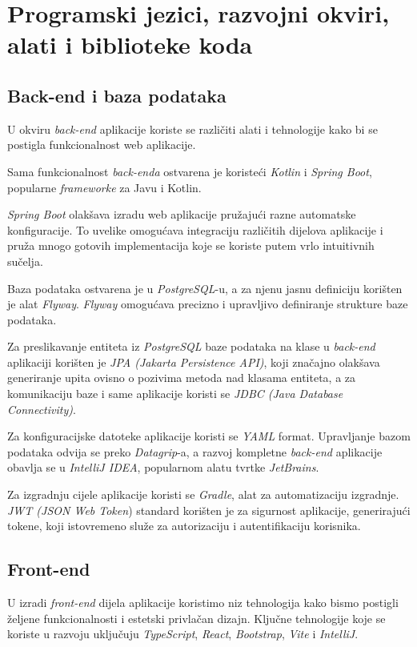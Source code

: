 		
		\section{Programski jezici, razvojni okviri, alati i biblioteke koda}
		
		
		\subsection{Back-end i baza podataka}
		U okviru \textit{back-end} aplikacije koriste se različiti alati i tehnologije kako bi se postigla funkcionalnost web aplikacije. 
		
		Sama funkcionalnost \textit{back-enda} ostvarena je koristeći \textit{Kotlin} i \textit{Spring Boot}, popularne \textit{frameworke} za Javu i Kotlin.
		
		\textit{Spring Boot} olakšava izradu web aplikacije pružajući razne automatske konfiguracije. To uvelike omogućava integraciju različitih dijelova aplikacije i pruža mnogo gotovih implementacija koje se koriste putem vrlo intuitivnih sučelja.
		
		Baza podataka ostvarena je u \textit{PostgreSQL}-u, a za njenu jasnu definiciju korišten je alat \textit{Flyway}. \textit{Flyway} omogućava precizno i upravljivo definiranje strukture baze podataka.
		
		Za preslikavanje entiteta iz \textit{PostgreSQL} baze podataka na klase u \textit{back-end} aplikaciji korišten je \textit{JPA (Jakarta Persistence API)}, koji značajno olakšava generiranje upita ovisno o pozivima metoda nad klasama entiteta, a za komunikaciju baze i same aplikacije koristi se \textit{JDBC (Java Database Connectivity)}.
		
		Za konfiguracijske datoteke aplikacije koristi se \textit{YAML} format. Upravljanje bazom podataka odvija se preko \textit{Datagrip}-a, a razvoj kompletne \textit{back-end} aplikacije obavlja se u \textit{IntelliJ IDEA}, popularnom alatu tvrtke \textit{JetBrains}. 
		
		Za izgradnju cijele aplikacije koristi se \textit{Gradle}, alat za automatizaciju izgradnje. 
\textit{JWT (JSON Web Token}) standard korišten je za sigurnost aplikacije, generirajući tokene, koji istovremeno služe za autorizaciju i autentifikaciju korisnika.


			\subsection{Front-end}
			U izradi \textit{front-end} dijela aplikacije koristimo niz tehnologija kako bismo postigli željene funkcionalnosti i estetski privlačan dizajn. Ključne tehnologije koje se koriste u razvoju uključuju \textit{TypeScript}, \textit{React}, \textit{Bootstrap}, \textit{Vite} i \textit{IntelliJ}.
			
